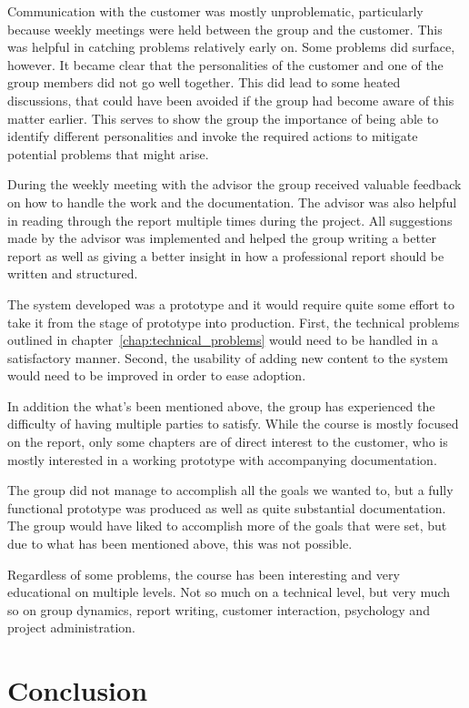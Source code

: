 \documentclass[11pt]{book}
\begin{document}
Communication with the customer was mostly unproblematic, particularly because weekly meetings were held between the group and the customer. This was helpful in catching problems relatively early on. Some problems did surface, however. It became clear that the personalities of the customer and one of the group members did not go well together. This did lead to some heated discussions, that could have been avoided if the group had become aware of this matter earlier. This serves to show the group the importance of being able to identify different personalities and invoke the required actions to mitigate potential problems that might arise.

During the weekly meeting with the advisor the group received valuable feedback on how to handle the work and the documentation. The advisor was also helpful in reading through the report multiple times during the project. All suggestions made by the advisor was implemented and helped the group writing a better report as well as giving a better insight in how a professional report should be written and structured.

The system developed was a prototype and it would require quite some effort to take it from the stage of prototype into production. First, the technical problems outlined in chapter~\ref{chap:technical_problems} would need to be handled in a satisfactory manner. Second, the usability of adding new content to the system would need to be improved in order to ease adoption.

In addition the what's been mentioned above, the group has experienced the difficulty of having multiple parties to satisfy. While the course is mostly focused on the report, only some chapters are of direct interest to the customer, who is mostly interested in a working prototype with accompanying documentation.

The group did not manage to accomplish all the goals we wanted to, but a fully functional prototype was produced as well as quite substantial documentation. The group would have liked to accomplish more of the goals that were set, but due to what has been mentioned above, this was not possible.

Regardless of some problems, the course has been interesting and very educational on multiple levels. Not so much on a technical level, but very much so on group dynamics, report writing, customer interaction, psychology and project administration.

\chapter{Conclusion}
\end{document}
